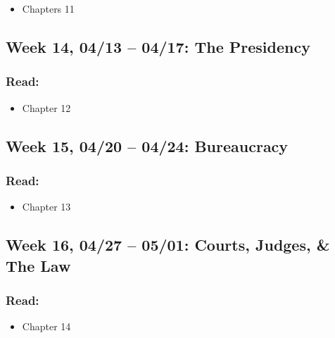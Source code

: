 \documentclass[11pt,]{article}
\providecommand{\tightlist}{%
  \setlength{\itemsep}{0pt}\setlength{\parskip}{0pt}}
\begin{document}
\begin{itemize}
\tightlist
\item
  Chapters 11
\end{itemize}

\hypertarget{week-14-0413-0417-the-presidency}{%
\subsection{Week 14, 04/13 -- 04/17: The
Presidency}\label{week-14-0413-0417-the-presidency}}

\hypertarget{read-12}{%
\subsubsection{Read:}\label{read-12}}

\begin{itemize}
\tightlist
\item
  Chapter 12
\end{itemize}

\hypertarget{week-15-0420-0424-bureaucracy}{%
\subsection{Week 15, 04/20 -- 04/24:
Bureaucracy}\label{week-15-0420-0424-bureaucracy}}

\hypertarget{read-13}{%
\subsubsection{Read:}\label{read-13}}

\begin{itemize}
\tightlist
\item
  Chapter 13
\end{itemize}

\hypertarget{week-16-0427-0501-courts-judges-the-law}{%
\subsection{Week 16, 04/27 -- 05/01: Courts, Judges, \& The
Law}\label{week-16-0427-0501-courts-judges-the-law}}

\hypertarget{read-14}{%
\subsubsection{Read:}\label{read-14}}

\begin{itemize}
\tightlist
\item
  Chapter 14
\end{itemize}
\end{document}
